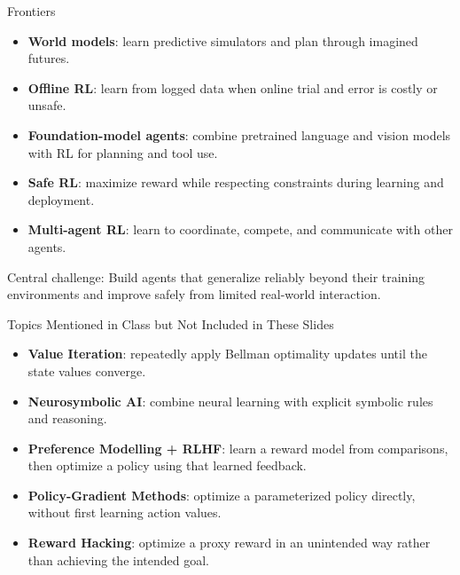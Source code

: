 \documentclass[aspectratio=169]{beamer}%
\begin{document}
\begin{frame}{Frontiers}
\small
\begin{itemize}
    \item \textbf{World models}: learn predictive simulators and plan through imagined futures.
    \item \textbf{Offline RL}: learn from logged data when online trial and error is costly or unsafe.
    \item \textbf{Foundation-model agents}: combine pretrained language and vision models with RL for planning and tool use.
    \item \textbf{Safe RL}: maximize reward while respecting constraints during learning and deployment.
    \item \textbf{Multi-agent RL}: learn to coordinate, compete, and communicate with other agents.
\end{itemize}

\vfill
\begin{alertblock}{Central challenge:}
Build agents that generalize reliably beyond their training environments and improve safely from limited real-world interaction.
\end{alertblock}
\end{frame}

\begin{frame}{Topics Mentioned in Class but Not Included in These Slides}
\small
\begin{itemize}
    \item \textbf{Value Iteration}: repeatedly apply Bellman optimality updates until the state values converge.
    \item \textbf{Neurosymbolic AI}: combine neural learning with explicit symbolic rules and reasoning.
    \item \textbf{Preference Modelling + RLHF}: learn a reward model from comparisons, then optimize a policy using that learned feedback.
    \item \textbf{Policy-Gradient Methods}: optimize a parameterized policy directly, without first learning action values.
    \item \textbf{Reward Hacking}: optimize a proxy reward in an unintended way rather than achieving the intended goal.
\end{itemize}
\end{frame}
\end{document}
